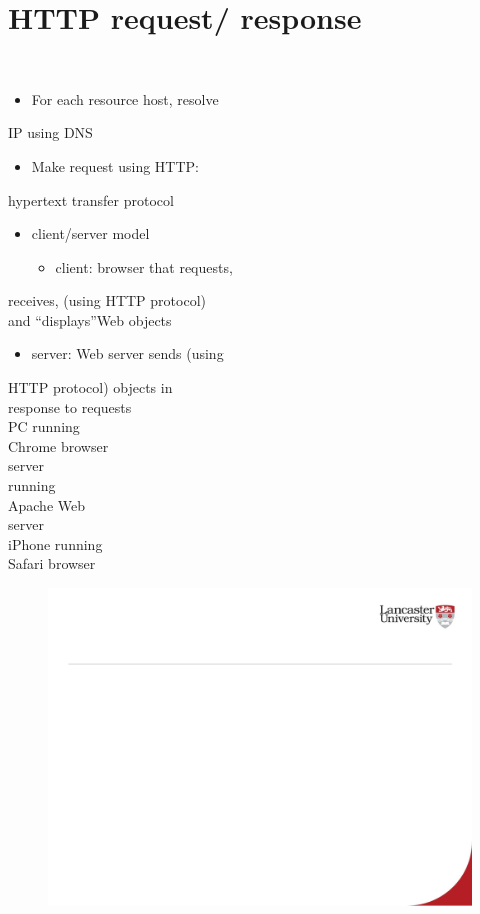 \documentclass[12pt]{article}
\begin{document}
\section{HTTP request/ response}
\\
\begin{itemize}
  \item For each resource host, resolve 
\end{itemize}
IP using DNS\\
\begin{itemize}
  \item Make request using HTTP: 
\end{itemize}
hypertext transfer protocol\\
\begin{itemize}
  \item client/server model
\begin{itemize}
  \item client: browser that requests, 
\end{itemize}
\end{itemize}
receives, (using HTTP protocol) \\
and “displays”Web objects \\
\begin{itemize}
  \item server: Web server sends (using 
\end{itemize}
HTTP protocol) objects in \\
response to requests\\
PC running\\
Chrome browser\\
server \\
running\\
Apache Web\\
server\\
iPhone running\\
Safari browser\\
\begin{figure}[H]
\includegraphics[width=0.5\linewidth]{page22-image-1.png}
\end{figure}
\end{document}
